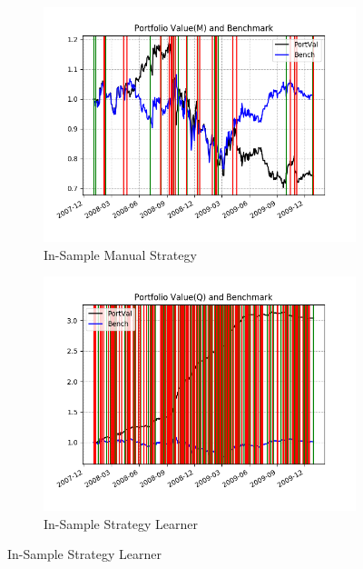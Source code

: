 \documentclass[12pt]{article}
\begin{document}
\begin{figure}
\begin{subfigure}{.5\textwidth}
\includegraphics[scale=0.5]{isme1.png}
\caption{In-Sample Manual Strategy}
\end{subfigure}
\begin{subfigure}{.5\textwidth}
\includegraphics[scale=0.5]{isqe1.png}
\caption{In-Sample Strategy Learner}
\end{subfigure}
\end{figure}
\end{document}
